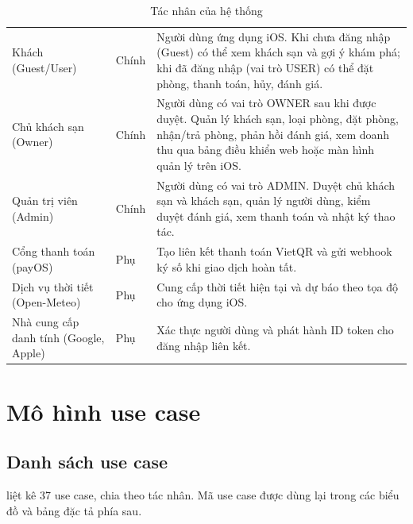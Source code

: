 \begin{table}[H]
\centering
\caption{Tác nhân của hệ thống}\label{tab:actors}
\begin{rtable}
\begin{tabular}{|L{3.2cm}|C{1.6cm}|L{9.9cm}|}
\hline
{} &  &  \\ \hline
Khách (Guest/User) & Chính & Người dùng ứng dụng iOS. Khi chưa đăng nhập (Guest) có thể xem khách sạn và gợi ý khám phá; khi đã đăng nhập (vai trò USER) có thể đặt phòng, thanh toán, hủy, đánh giá. \\ \hline
Chủ khách sạn (Owner) & Chính & Người dùng có vai trò OWNER sau khi được duyệt. Quản lý khách sạn, loại phòng, đặt phòng, nhận/trả phòng, phản hồi đánh giá, xem doanh thu qua bảng điều khiển web hoặc màn hình quản lý trên iOS. \\ \hline
Quản trị viên (Admin) & Chính & Người dùng có vai trò ADMIN. Duyệt chủ khách sạn và khách sạn, quản lý người dùng, kiểm duyệt đánh giá, xem thanh toán và nhật ký thao tác. \\ \hline
Cổng thanh toán (payOS) & Phụ & Tạo liên kết thanh toán VietQR và gửi webhook ký số khi giao dịch hoàn tất. \\ \hline
Dịch vụ thời tiết (Open-Meteo) & Phụ & Cung cấp thời tiết hiện tại và dự báo theo tọa độ cho ứng dụng iOS. \\ \hline
Nhà cung cấp danh tính (Google, Apple) & Phụ & Xác thực người dùng và phát hành ID token cho đăng nhập liên kết. \\ \hline
\end{tabular}
\end{rtable}
\end{table}

\section{Mô hình use case}\label{sec:usecases}

\subsection{Danh sách use case}

 liệt kê 37 use case, chia theo tác nhân. Mã use case được dùng lại trong các biểu đồ và bảng đặc tả phía sau.

